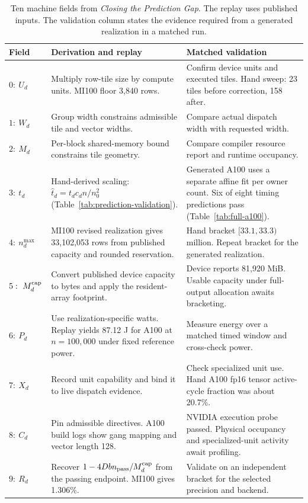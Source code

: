 \documentclass[sigplan,10pt,review,anonymous,balance=false,pbalance=false]{acmart}
\begin{document}
\begin{table}[tp]
\centering\footnotesize
\caption{Ten machine fields from \emph{Closing the Prediction Gap}. The replay uses published inputs. The validation column states the evidence required from a generated realization in a matched run.}\label{tab:ten-calibration}
\begin{tabular}{@{}p{}p{}p{}@{}}\toprule
Field & Derivation and replay & Matched validation \\\midrule
$0:\ U_d$ & Multiply row-tile size by compute units. MI100 floor 3,840 rows. & Confirm device units and executed tiles. Hand sweep: 23 tiles before correction, 158 after. \\
$1:\ W_d$ & Group width constrains admissible tile and vector widths. & Compare actual dispatch width with requested width. \\
$2:\ M_d$ & Per-block shared-memory bound constrains tile geometry. & Compare compiler resource report and runtime occupancy. \\
$3:\ t_d$ & Hand-derived scaling: $\widehat t_d=t_dc_dn/n_0^2$ (Table~\ref{tab:prediction-validation}). & Generated A100 uses a separate affine fit per owner count. Six of eight timing predictions pass (Table~\ref{tab:full-a100}). \\
$4:\ n_d^{\max}$ & MI100 revised realization gives 33,102,053 rows from published capacity and rounded reservation. & Hand bracket $[33.1,33.3)$ million. Repeat bracket for the generated realization. \\
$5:\ M_d^{\rm cap}$ & Convert published device capacity to bytes and apply the resident-array footprint. & Device reports 81,920 MiB. Usable capacity under full-output allocation awaits bracketing. \\
$6:\ P_d$ & Use realization-specific watts. Replay yields 87.12 J for A100 at $n=100{,}000$ under fixed reference power. & Measure energy over a matched timed window and cross-check power. \\
$7:\ X_d$ & Record unit capability and bind it to live dispatch evidence. & Check specialized unit use. Hand A100 fp16 tensor active-cycle fraction was about 20.7\%. \\
$8:\ C_d$ & Pin admissible directives. A100 build logs show gang mapping and vector length 128. & NVIDIA execution probe passed. Physical occupancy and specialized-unit activity await profiling. \\
$9:\ R_d$ & Recover $1-4Dbn_{\rm pass}/M_d^{\rm cap}$ from the passing endpoint. MI100 gives 1.306\%. & Validate on an independent bracket for the selected precision and backend. \\
\bottomrule\end{tabular}
\end{table}
\end{document}
